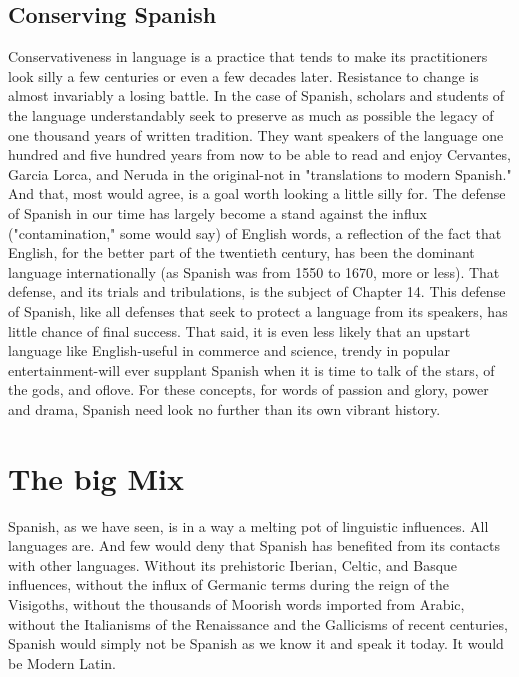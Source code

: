 \documentclass[14pt,a4paper,oneside]{memoir}
\begin{document}
{{{{\section{Conserving Spanish}

Conservativeness in language is a practice that tends to make
its practitioners look silly a few centuries or even a few decades later.
Resistance to change is almost invariably a losing battle. In the case of
Spanish, scholars and students of the language understandably seek to
preserve as much as possible the legacy of one thousand years of written tradition. They want speakers of the language one hundred and five
hundred years from now to be able to read and enjoy Cervantes, Garcia
Lorca, and Neruda in the original-not in "translations to modern
Spanish." And that, most would agree, is a goal worth looking a little
silly for.
The defense of Spanish in our time has largely become a stand
against the influx ("contamination," some would say) of English words,
a reflection of the fact that English, for the better part of the twentieth
century, has been the dominant language internationally (as Spanish
was from 1550 to 1670, more or less). That defense, and its trials and
tribulations, is the subject of Chapter 14.
This defense of Spanish, like all defenses that seek to protect a
language from its speakers, has little chance of final success. That said,
it is even less likely that an upstart language like English-useful in
commerce and science, trendy in popular entertainment-will ever
supplant Spanish when it is time to talk of the stars, of the gods, and
oflove. For these concepts, for words of passion and glory, power and
drama, Spanish need look no further than its own vibrant history.

\chapter{The big Mix}

Spanish, as we have seen, is in a way a melting pot of linguistic influences. All languages are. And few would deny that Spanish has
benefited from its contacts with other languages. Without its prehistoric Iberian, Celtic, and Basque influences, without the influx of Germanic terms during the reign of the Visigoths, without the thousands
of Moorish words imported from Arabic, without the Italianisms of
the Renaissance and the Gallicisms of recent centuries, Spanish would
simply not be Spanish as we know it and speak it today. It would be
Modern Latin.

}}}}
\end{document}
